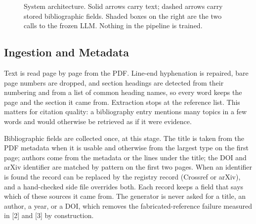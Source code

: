 \documentclass[10pt,twocolumn,letterpaper]{article}
\begin{document}
\begin{figure}[t]
{}
\caption{System architecture. Solid arrows carry text; dashed arrows carry stored bibliographic fields. Shaded boxes on the right are the two calls to the frozen LLM. Nothing in the pipeline is trained.}
\label{fig:arch}
\end{figure}

\subsection{Ingestion and Metadata}
Text is read page by page from the PDF. Line-end hyphenation is repaired, bare page numbers are dropped, and section headings are detected from their numbering and from a list of common heading names, so every word keeps the page and the section it came from. Extraction stops at the reference list. This matters for citation quality: a bibliography entry mentions many topics in a few words and would otherwise be retrieved as if it were evidence.

Bibliographic fields are collected once, at this stage. The title is taken from the PDF metadata when it is usable and otherwise from the largest type on the first page; authors come from the metadata or the lines under the title; the DOI and arXiv identifier are matched by pattern on the first two pages. When an identifier is found the record can be replaced by the registry record (Crossref or arXiv), and a hand-checked side file overrides both. Each record keeps a field that says which of these sources it came from. The generator is never asked for a title, an author, a year, or a DOI, which removes the fabricated-reference failure measured in [2] and [3] by construction.
\end{document}
